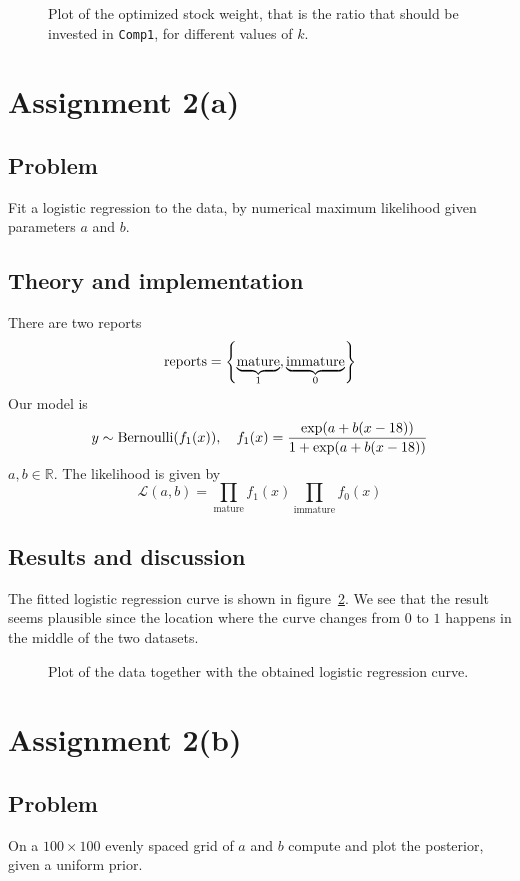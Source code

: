 \documentclass[11pt, a4paper]{article}
\let\originalleft\left
\let\originalright\right
\renewcommand{\left}{\mathopen{}\mathclose\bgroup\originalleft}
\renewcommand{\right}{\aftergroup\egroup\originalright}
\DeclareMathOperator{\Bernoulli}{Bernoulli}
\begin{document}
\begin{figure}
	\centering
	
	\caption{Plot of the optimized stock weight,
		that is the ratio that should be invested in \texttt{Comp1},
	for different values of $k$. \label{fig:stock_weights}}
\end{figure}

\section{Assignment 2(a)}
\subsection{Problem}
Fit a logistic regression to the data, by numerical maximum likelihood
given parameters $a$ and $b$.
\subsection{Theory and implementation}
There are two reports
$$ \text{reports} = \left\{\underbrace{\text{mature}}_1, \underbrace{\text{immature}}_0\right\} $$
Our model is
$$ y \sim \Bernoulli(f_1(x)), \quad f_1(x) = \frac{\exp\left(a + b (x - 18)\right)}{1 + \exp\left(a + b (x - 18)\right)} $$
$a, b \in \mathbb R$.
The likelihood is given by
$$ \mathcal L(a, b) = \prod_{\text{mature}} f_1(x) \prod_{\text{immature}} f_0(x) $$
\subsection{Results and discussion}
The fitted logistic regression curve is shown in figure~\ref{fig:logistic_regression}.
We see that the result seems plausible since the location where the curve
changes from $0$ to $1$ happens in the middle of the two datasets.

\begin{figure}
	\centering
	
	\caption{Plot of the data together with the obtained logistic regression curve. \label{fig:logistic_regression}}
\end{figure}

\section{Assignment 2(b)}
\subsection{Problem}
On a $100 \times 100$ evenly spaced grid of $a$ and $b$ compute and plot
the posterior,
given a uniform prior.
\end{document}
